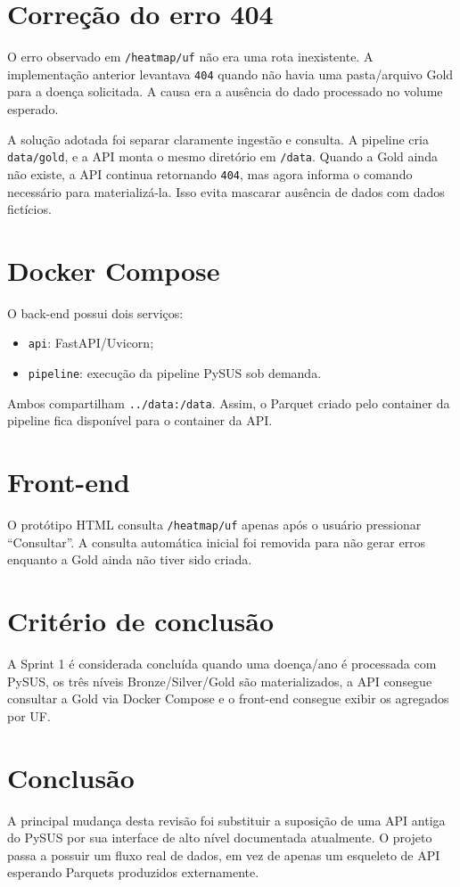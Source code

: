 \documentclass[12pt,a4paper]{article}
\begin{document}
\section{Correção do erro 404}
O erro observado em \texttt{/heatmap/uf} não era uma rota inexistente. A implementação anterior levantava \texttt{404} quando não havia uma pasta/arquivo Gold para a doença solicitada. A causa era a ausência do dado processado no volume esperado.

A solução adotada foi separar claramente ingestão e consulta. A pipeline cria \texttt{data/gold}, e a API monta o mesmo diretório em \texttt{/data}. Quando a Gold ainda não existe, a API continua retornando \texttt{404}, mas agora informa o comando necessário para materializá-la. Isso evita mascarar ausência de dados com dados fictícios.

\section{Docker Compose}
O back-end possui dois serviços:
\begin{itemize}
\item \texttt{api}: FastAPI/Uvicorn;
\item \texttt{pipeline}: execução da pipeline PySUS sob demanda.
\end{itemize}
Ambos compartilham \texttt{../data:/data}. Assim, o Parquet criado pelo container da pipeline fica disponível para o container da API.

\section{Front-end}
O protótipo HTML consulta \texttt{/heatmap/uf} apenas após o usuário pressionar ``Consultar''. A consulta automática inicial foi removida para não gerar erros enquanto a Gold ainda não tiver sido criada.

\section{Critério de conclusão}
A Sprint 1 é considerada concluída quando uma doença/ano é processada com PySUS, os três níveis Bronze/Silver/Gold são materializados, a API consegue consultar a Gold via Docker Compose e o front-end consegue exibir os agregados por UF.

\section{Conclusão}
A principal mudança desta revisão foi substituir a suposição de uma API antiga do PySUS por sua interface de alto nível documentada atualmente. O projeto passa a possuir um fluxo real de dados, em vez de apenas um esqueleto de API esperando Parquets produzidos externamente.
\end{document}

